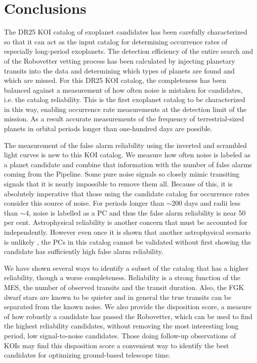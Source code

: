 

\section{Conclusions}

The DR25 KOI catalog of exoplanet candidates has been carefully characterized so that it can act as the input catalog for determining  occurrence rates of especially long-period exoplanets. The detection efficiency of the entire search \citep{Burke2017b,Christiansen2017} and of the Robovetter vetting process has been calculated by injecting planetary transits into the data and determining which types of planets are found and which are missed. For this DR25 KOI catalog, the completeness has been balanced against a measurement of how often noise is mistaken for candidates, i.e. the catalog reliability. This is the first exoplanet catalog to be characterized in this way, enabling occurrence rate measurements at the detection limit of the mission.  As a result accurate measurements of the frequency of terrestrial-sized planets in orbital periods longer than one-hundred days are possible.

The measurement of the false alarm reliability using the inverted and scrambled light curves is new to this KOI catalog. We measure how often noise is labeled as a planet candidate and combine that information with the number of false alarms coming from the \Kepler{} Pipeline. Some pure noise signals so closely mimic transiting signals that it is nearly impossible to remove them all. Because of this, it is absolutely imperative that those using the candidate catalog for occurrence rates consider this source of noise. For periods longer than $\sim$200 days and radii less than $\sim$4\Rearth, noise is labelled as a PC and thus the false alarm reliability is near 50 per cent.  Astrophysical reliability is another concern that must be accounted for independently.  However even once it is shown that another astrophysical scenario is unlikely \citep[as was done for the DR24 KOIs in ][]{Morton2017}, the PCs in this catalog cannot be validated without first showing the candidate has sufficiently high false alarm reliability. 

We have shown several ways to identify a subset of the catalog that has a higher reliability, though a worse completeness. Reliability is a strong function of the MES, the number of observed transits and the transit duration. Also, the FGK dwarf stars are known to be quieter and in general the true transits can be separated from the known noise. We also provide the disposition score, a measure of how robustly a candidate has passed the Robovetter, which can be used to find the highest reliability candidates, without removing the most interesting long period, low signal-to-noise candidates. Those doing follow-up observations of KOIs may find this disposition score a convenient way to identify the best candidates for optimizing ground-based telescope time.

